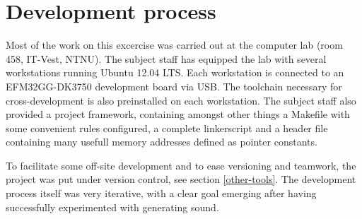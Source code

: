 \section{Development process}

Most of the work on this excercise was carried out at the computer lab (room 458, IT-Vest, NTNU). The subject staff has equipped the lab with several workstations running Ubuntu 12.04 LTS. Each workstation is connected to an EFM32GG-DK3750 development board via USB. The toolchain necessary for cross-development is also preinstalled on each workstation. The subject staff also provided a project framework, containing amongst other things a Makefile with some convenient rules configured, a complete linkerscript and a header file containing many usefull memory addresses defined as pointer constants.

To facilitate some off-site development and to ease versioning and teamwork, the project was put under version control, see section \ref{other-tools}. The development process itself was very iterative, with a clear goal emerging after having successfully experimented with generating sound.

